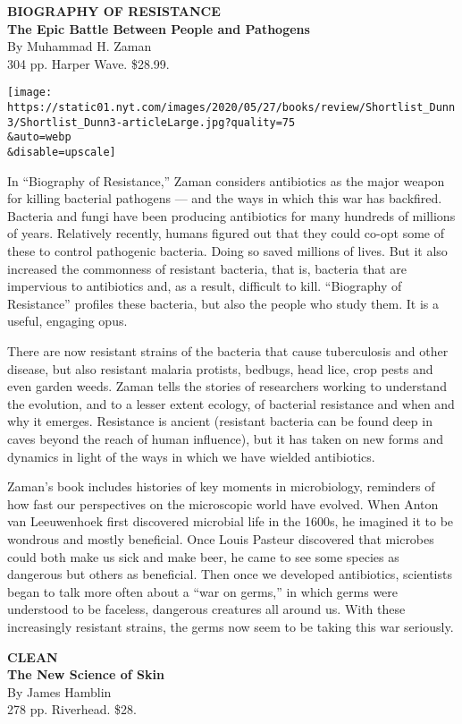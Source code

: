 \textbf{BIOGRAPHY OF RESISTANCE}\\
\textbf{The Epic Battle Between People and Pathogens}\\
By Muhammad H. Zaman\\
304 pp. Harper Wave. \$28.99.

\texttt{[image: https://static01.nyt.com/images/2020/05/27/books/review/Shortlist\_Dunn3/Shortlist\_Dunn3-articleLarge.jpg?quality=75\\\&auto=webp\\\&disable=upscale]}

In ``Biography of Resistance,'' Zaman considers antibiotics as the major
weapon for killing bacterial pathogens --- and the ways in which this
war has backfired. Bacteria and fungi have been producing antibiotics
for many hundreds of millions of years. Relatively recently, humans
figured out that they could co-opt some of these to control pathogenic
bacteria. Doing so saved millions of lives. But it also increased the
commonness of resistant bacteria, that is, bacteria that are impervious
to antibiotics and, as a result, difficult to kill. ``Biography of
Resistance'' profiles these bacteria, but also the people who study
them. It is a useful, engaging opus.

There are now resistant strains of the bacteria that cause tuberculosis
and other disease, but also resistant malaria protists, bedbugs, head
lice, crop pests and even garden weeds. Zaman tells the stories of
researchers working to understand the evolution, and to a lesser extent
ecology, of bacterial resistance and when and why it emerges. Resistance
is ancient (resistant bacteria can be found deep in caves beyond the
reach of human influence), but it has taken on new forms and dynamics in
light of the ways in which we have wielded antibiotics.

Zaman's book includes histories of key moments in microbiology,
reminders of how fast our perspectives on the microscopic world have
evolved. When Anton van Leeuwenhoek first discovered microbial life in
the 1600s, he imagined it to be wondrous and mostly beneficial. Once
Louis Pasteur discovered that microbes could both make us sick and make
beer, he came to see some species as dangerous but others as beneficial.
Then once we developed antibiotics, scientists began to talk more often
about a ``war on germs,'' in which germs were understood to be faceless,
dangerous creatures all around us. With these increasingly resistant
strains, the germs now seem to be taking this war seriously.

\textbf{CLEAN}\\
\textbf{The New Science of Skin}\\
By James Hamblin\\
278 pp. Riverhead. \$28.

